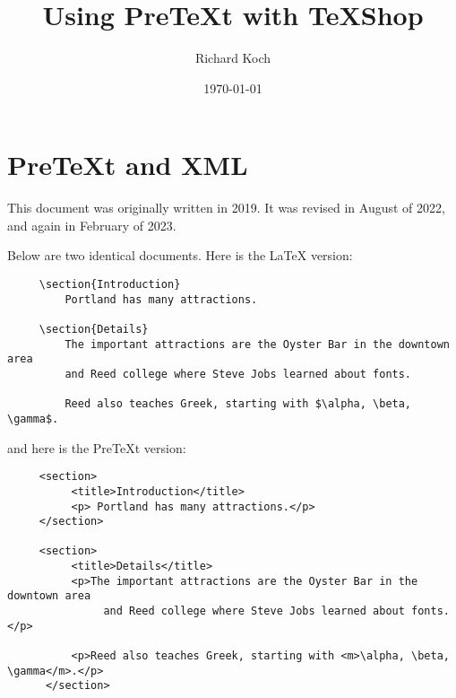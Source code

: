 \documentclass[11pt, oneside]{article}   	%
\title{Using PreTeXt with TeXShop}
\author{Richard Koch}
\date{\today}							%
\begin{document}
\maketitle


\section{PreTeXt and XML}
 This document was originally written in 2019. It was revised in August of 2022, and again in February of 2023.
  
 Below are two identical documents. Here is the LaTeX version:%
\begin{verbatim}
     \section{Introduction}
         Portland has many attractions.

     \section{Details}
         The important attractions are the Oyster Bar in the downtown area 
         and Reed college where Steve Jobs learned about fonts. 

         Reed also teaches Greek, starting with $\alpha, \beta, \gamma$.
\end{verbatim}
 \vspace{.1in}
 and here is the PreTeXt version:
 \vspace{.1in}
 \begin{verbatim}
     <section>
          <title>Introduction</title>
          <p> Portland has many attractions.</p>
     </section>
      
     <section>
          <title>Details</title>
          <p>The important attractions are the Oyster Bar in the downtown area 
               and Reed college where Steve Jobs learned about fonts. </p>
     
          <p>Reed also teaches Greek, starting with <m>\alpha, \beta, \gamma</m>.</p>
      </section>
\end{verbatim}
\end{document}
